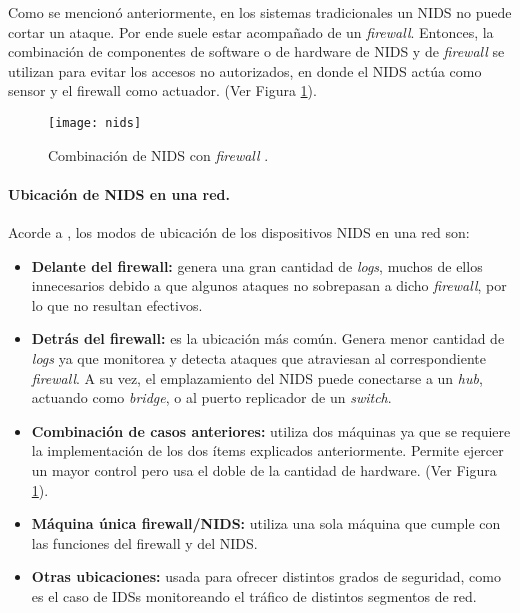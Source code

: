 Como se mencionó anteriormente, en los sistemas tradicionales un NIDS no puede
cortar un ataque. Por ende suele estar acompañado de un \textit{firewall}.
Entonces, la combinación de componentes de software o de hardware de NIDS y de
\textit{firewall} se utilizan para evitar los accesos no autorizados, en donde
el NIDS actúa como sensor y el firewall como actuador. (Ver Figura
\ref{fig:firewall_NIDS}).

\begin{figure}[!]
	\centering 
	\texttt{[image: nids]}
	\caption[Combinación de NIDS con \textit{firewall}]{Combinación de NIDS con \textit{firewall} \parencite{ids_snort}.}
	\label{fig:firewall_NIDS}
\end{figure}

\paragraph{Ubicación de NIDS en una red.}

Acorde a \parencite{ubicacion_nids}, los modos de ubicación de los dispositivos
NIDS en una red son:

\begin{itemize}
\item \textbf{Delante del firewall:} genera una gran cantidad de \textit{logs},
  muchos de ellos innecesarios debido a que algunos ataques no sobrepasan a
  dicho \textit{firewall}, por lo que no resultan efectivos.
\item \textbf{Detrás del firewall:} es la ubicación más común. Genera menor
  cantidad de \textit{logs} ya que monitorea y detecta ataques que atraviesan al
  correspondiente \textit{firewall}. A su vez, el emplazamiento del NIDS puede
  conectarse a un \textit{hub}, actuando como \textit{bridge}, o al
  puerto replicador de un \textit{switch}.

\item \textbf {Combinación de casos anteriores:} utiliza dos máquinas ya que se
  requiere la implementación de los dos ítems explicados anteriormente. Permite
  ejercer un mayor control pero usa el doble de la cantidad de hardware. (Ver Figura
\ref{fig:firewall_NIDS}).
\item \textbf {Máquina única firewall/NIDS:} utiliza una sola máquina que cumple
  con las funciones del firewall y del NIDS.
\item \textbf {Otras ubicaciones:} usada para ofrecer distintos grados de
  seguridad, como es el caso de IDSs monitoreando el tráfico de distintos
  segmentos de red.
\end{itemize}

